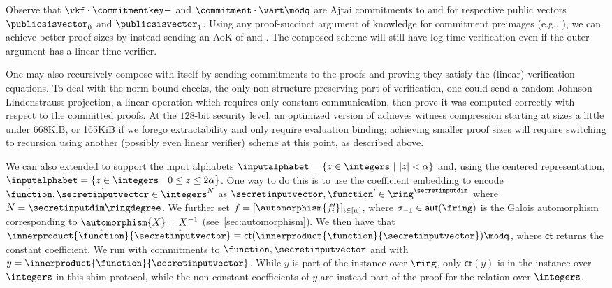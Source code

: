 Observe that $\vkf \cdot \commitmentkey - \output \modq$ and $\commitment \cdot \vart \modq$ are Ajtai \rsis commitments to \proofopening and \proofknowledge for respective public vectors $\publicsisvector_0$ and $\publicsisvector_1$. Using any proof-succinct argument of knowledge for \rsis commitment preimages (e.g., \cite{BS22}), we can achieve better proof sizes by instead sending an AoK of \proofopening and \proofknowledge. The composed scheme will still have log-time verification even if the outer argument has a linear-time verifier.

One may also recursively compose \sys with itself by sending commitments to the proofs and proving they satisfy the (linear) verification equations. To deal with the norm bound checks, the only non-structure-preserving part of verification, one could send a random Johnson-Lindenstrauss projection, a linear operation which requires only constant communication, then prove it was computed correctly with respect to the committed proofs. At the $128$-bit security level, an optimized version of \sys achieves witness compression starting at sizes a little under 668KiB, or 165KiB if we forego extractability and only require evaluation binding; achieving smaller proof sizes will require switching to recursion using another (possibly even linear verifier) scheme at this point, as described above.

We can also extended \sys to support the input alphabets $\inputalphabet = \set{z \in \integers \ | \ |z| < \alpha}$ and, using the centered representation, $\inputalphabet = \set{z \in \integers \ | \ 0 \leq z \leq 2\alpha}$. One way to do this is to use the coefficient embedding to encode $\hat{\function}, \hat{\secretinputvector} \in \integers^{N}$ as $\secretinputvector, \function' \in \ring^\secretinputdim$ where $N=\secretinputdim \ringdegree$. We further set $f = [\automorphism{f'_{i}}]_{i \in [w]}$, where $\sigma_{-1} \in \mathsf{aut}(\fring)$ is the Galois automorphism corresponding to $\automorphism{X} = X^{-1}$ (see~\cref{sec:automorphism}). We then have that $\innerproduct{\hat{\function}}{\hat{\secretinputvector}} \equiv \mathsf{ct}(\innerproduct{\function}{\secretinputvector}) \modq$, where $\mathsf{ct}$ returns the constant coefficient. We run \sys with commitments to $\function, \secretinputvector$ and with $y = \innerproduct{\function}{\secretinputvector}$. While $y$ is part of the instance over $\ring$, only $\mathsf{ct}(y)$ is in the instance over $\integers$ in this shim protocol, while the non-constant coefficients of $y$ are instead part of the proof for the relation over $\integers$.

